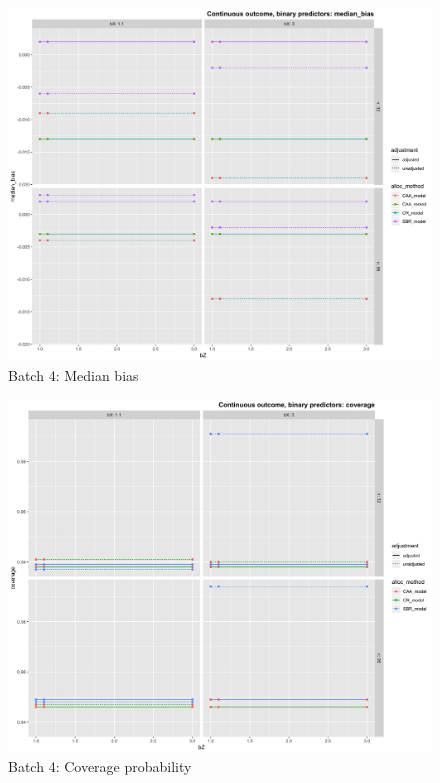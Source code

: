 \begin{figure}[H]
	\includegraphics[width=\linewidth]{figures/b4_median_bias_all_methods_adj_unadj}
	\caption{Batch 4: Median bias}
	\label{fig:b4mb}
\end{figure}

\begin{figure}[H]
	\includegraphics[width=\linewidth]{figures/b4_coverage_all_methods_adj_unadj}
	\caption{Batch 4: Coverage probability}
	\label{fig:b4c}
\end{figure}

